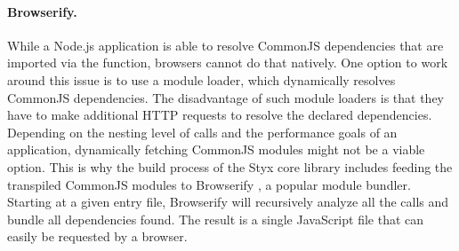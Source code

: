 \paragraph{Browserify.}
While a Node.js application is able to resolve CommonJS dependencies that are imported via the  function, browsers cannot do that natively. One option to work around this issue is to use a module loader, which dynamically resolves CommonJS dependencies. The disadvantage of such module loaders is that they have to make additional HTTP requests to resolve the declared dependencies. Depending on the nesting level of  calls and the performance goals of an application, dynamically fetching CommonJS modules might not be a viable option. This is why the build process of the Styx core library includes feeding the transpiled CommonJS modules to Browserify \cite{browserify}, a popular module bundler. Starting at a given entry file, Browserify will recursively analyze all the  calls and bundle all dependencies found. The result is a single JavaScript file that can easily be requested by a browser.